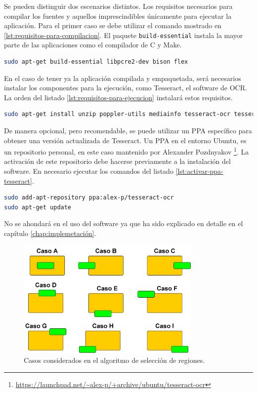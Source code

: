 Se pueden distinguir dos escenarios distintos. Los requisitos necesarios para compilar los fuentes y aquellos imprescindibles únicamente para ejecutar la aplicación. Para el primer caso se debe utilizar el comando mostrado en \ref{lst:requisitos-para-compilacion}. El paquete \verb|build-essential| instala la mayor parte de las aplicaciones como el compilador de C y Make.

\begin{lstlisting}[language=bash,caption={Dependencias para la compilación.},label=lst:requisitos-para-compilacion]
sudo apt-get build-essential libpcre2-dev bison flex
\end{lstlisting}

En el caso de tener ya la aplicación compilada y empaquetada, será necesarios instalar los componentes para la ejecución, como Tesseract, el software de OCR. La orden del listado \ref{lst:requisitos-para-ejecucion} instalará estos requisitos.

\begin{lstlisting}[language=bash,caption={Dependencias para la ejecución.},label=lst:requisitos-para-ejecucion]
sudo apt-get install unzip poppler-utils mediainfo tesseract-ocr tesseract-ocr-spa jq python3-opencv jq bc
\end{lstlisting}

De manera opcional, pero recomendable, se puede utilizar un PPA específico para obtener una versión actualizada de Tesseract. Un PPA en el entorno Ubuntu, es un repositorio personal, en este caso mantenido por Alexander Pozdnyakov \footnote{\url{https://launchpad.net/~alex-p/+archive/ubuntu/tesseract-ocr}}. La activación de este repositorio debe hacerse previamente a la instalación del software. En necesario ejecutar los comandos del listado \ref{lst:activar-ppa-tesseract}.

\begin{lstlisting}[language=bash,caption={Activar PPA de Tesseract.},label=lst:activar-ppa-tesseract]
sudo add-apt-repository ppa:alex-p/tesseract-ocr
sudo apt-get update
\end{lstlisting}

No se ahondará en el uso del software ya que ha sido explicado en detalle en el capítulo \ref{chap:implemetación}.

\begin{figure}[hp!]
    \centering
    \includegraphics[width=0.8\textwidth]{imaxes/z-adicional/casos-algoritmo-seleccion-regiones.png}
    \caption{Casos considerados en el algoritmo de selección de regiones.}
    \label{fig:casos-algoritmo-seleccion-regiones}
\end{figure}